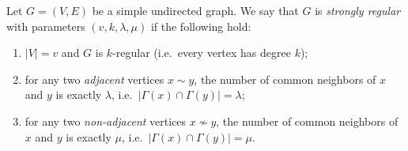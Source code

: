 \documentclass[11pt, a4paper]{ctexrep}
\begin{document}
\begin{definition}
    Let $G=(V,E)$ be a simple undirected graph. We say that $G$ is \emph{strongly regular}
    with parameters $(v,k,\lambda,\mu)$ if the following hold:
    \begin{enumerate}
        \item $|V|=v$ and $G$ is $k$-regular (i.e.\ every vertex has degree $k$);
        \item for any two \emph{adjacent} vertices $x\sim y$, the number of common neighbors of $x$ and $y$
              is exactly $\lambda$, i.e.\ $|\Gamma(x)\cap \Gamma(y)|=\lambda$;
        \item for any two \emph{non-adjacent} vertices $x\not\sim y$, the number of common neighbors of $x$ and $y$
              is exactly $\mu$, i.e.\ $|\Gamma(x)\cap \Gamma(y)|=\mu$.
    \end{enumerate}
\end{definition}
\end{document}
